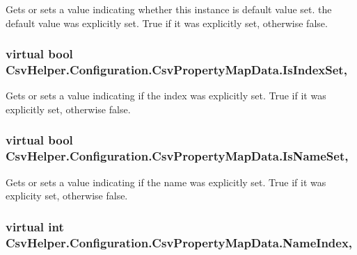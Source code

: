 Gets or sets a value indicating whether this instance is default value set. the default value was explicitly set. True if it was explicitly set, otherwise false. 

\hypertarget{a00053_a6af03961e4cab7536aca530902fe4e43}{
\subsubsection[{Is\-Index\-Set}]{\setlength{\rightskip}{0pt plus 5cm}virtual bool Csv\-Helper.\-Configuration.\-Csv\-Property\-Map\-Data.\-Is\-Index\-Set\hspace{0.3cm}{\ttfamily [get]}, {\ttfamily [set]}}}\label{a00053_a6af03961e4cab7536aca530902fe4e43}


Gets or sets a value indicating if the index was explicitly set. True if it was explicitly set, otherwise false. 

\hypertarget{a00053_a4edc08c491e692d4b187c4e436a0a216}{
\subsubsection[{Is\-Name\-Set}]{\setlength{\rightskip}{0pt plus 5cm}virtual bool Csv\-Helper.\-Configuration.\-Csv\-Property\-Map\-Data.\-Is\-Name\-Set\hspace{0.3cm}{\ttfamily [get]}, {\ttfamily [set]}}}\label{a00053_a4edc08c491e692d4b187c4e436a0a216}


Gets or sets a value indicating if the name was explicitly set. True if it was explicity set, otherwise false. 

\hypertarget{a00053_acf816322908241de17cad1d9a66add43}{
\subsubsection[{Name\-Index}]{\setlength{\rightskip}{0pt plus 5cm}virtual int Csv\-Helper.\-Configuration.\-Csv\-Property\-Map\-Data.\-Name\-Index\hspace{0.3cm}{\ttfamily [get]}, {\ttfamily [set]}}}\label{a00053_acf816322908241de17cad1d9a66add43}


